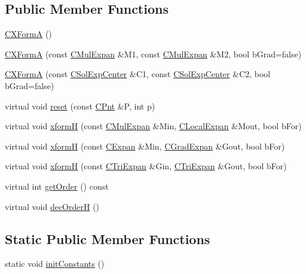 \subsection*{Public Member Functions}
\begin{DoxyCompactItemize}
\item 
\hyperlink{classCXFormA_a5704b7b2ccd538c5b1bf084066bbc469}{C\-X\-Form\-A} ()
\item 
\hyperlink{classCXFormA_a5dd98ae9527148a185ed270e2b2e66ce}{C\-X\-Form\-A} (const \hyperlink{classCMulExpan}{C\-Mul\-Expan} \&M1, const \hyperlink{classCMulExpan}{C\-Mul\-Expan} \&M2, bool b\-Grad=false)
\item 
\hyperlink{classCXFormA_a9f0b4057d6a02fdddec928e482f2d229}{C\-X\-Form\-A} (const \hyperlink{classCSolExpCenter}{C\-Sol\-Exp\-Center} \&C1, const \hyperlink{classCSolExpCenter}{C\-Sol\-Exp\-Center} \&C2, bool b\-Grad=false)
\item 
virtual void \hyperlink{classCXFormA_a377093746246e73a94e54935b3016656}{reset} (const \hyperlink{classCPnt}{C\-Pnt} \&P, int p)
\item 
virtual void \hyperlink{classCXFormA_abae07c69c6e9e291f7969c006b369723}{xform\-H} (const \hyperlink{classCMulExpan}{C\-Mul\-Expan} \&Min, \hyperlink{classCLocalExpan}{C\-Local\-Expan} \&Mout, bool b\-For)
\item 
virtual void \hyperlink{classCXFormA_a2200c05156f40bcb5eee6dd5f186eb9c}{xform\-H} (const \hyperlink{classCExpan}{C\-Expan} \&Min, \hyperlink{classCGradExpan}{C\-Grad\-Expan} \&Gout, bool b\-For)
\item 
virtual void \hyperlink{classCXFormA_af469ed9f14a55fc62271e81ac0a51638}{xform\-H} (const \hyperlink{classCTriExpan}{C\-Tri\-Expan} \&Gin, \hyperlink{classCTriExpan}{C\-Tri\-Expan} \&Gout, bool b\-For)
\item 
virtual int \hyperlink{classCXFormA_a64847a3bb2698da1789d5e6a83522cfe}{get\-Order} () const 
\item 
virtual void \hyperlink{classCXFormA_a29f88d44ed9093c87890c11155b00ddb}{dec\-Order\-H} ()
\end{DoxyCompactItemize}
\subsection*{Static Public Member Functions}
\begin{DoxyCompactItemize}
\item 
static void \hyperlink{classCXFormA_a7577bd4619b9763a25f9eb2728b88bd5}{init\-Constants} ()
\end{DoxyCompactItemize}
